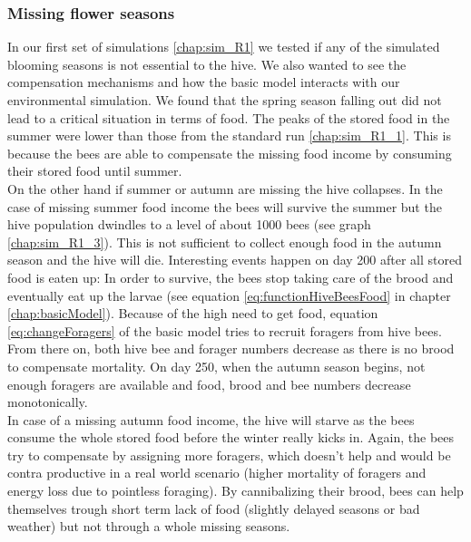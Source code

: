 	\subsubsection{Missing flower seasons}
		\label{chap:missingFlowerSeasons}
		In our first set of simulations \ref{chap:sim_R1} we tested if any of the simulated blooming seasons is not essential to the hive. We also wanted to see the compensation mechanisms and how the basic model interacts with our environmental simulation. We found that the spring season falling out did not lead to a critical situation in terms of food. The peaks of the stored food in the summer were lower than those from the standard run \ref{chap:sim_R1_1}. This is because the bees are able to compensate the missing food income by consuming their stored food until summer.\\
		On the other hand if summer or autumn are missing the hive collapses. In the case of missing summer food income the bees will survive the summer but the hive population dwindles to a level of about 1000 bees (see graph \ref{chap:sim_R1_3}). This is not sufficient to collect enough food in the autumn season and the hive will die. Interesting events happen on day 200 after all stored food is eaten up: In order to survive, the bees stop taking care of the brood and eventually eat up the larvae (see equation \ref{eq:functionHiveBeesFood} in chapter \ref{chap:basicModel}). Because of the high need to get food, equation \ref{eq:changeForagers} of the basic model tries to recruit foragers from hive bees. From there on, both hive bee and forager numbers decrease as there is no brood to compensate mortality. On day 250, when the autumn season begins, not enough foragers are available and food, brood and bee numbers decrease monotonically.\\
		In case of a missing autumn food income, the hive will starve as the bees consume the whole stored food before the winter really kicks in. Again, the bees try to compensate by assigning more foragers, which doesn't help and would be contra productive in a real world scenario (higher mortality of foragers and energy loss due to pointless foraging).
		By cannibalizing their brood, bees can help themselves trough short term lack of food (slightly delayed seasons or bad weather) but not through a whole missing seasons.
		
